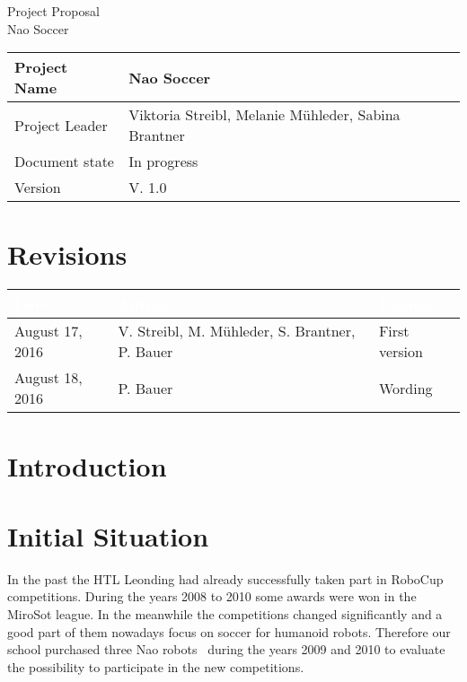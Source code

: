 \documentclass[12pt]{article}
\theoremstyle{definition}
\newcommand{\projectname}{Nao Soccer}
\newcommand{\productname}{Nao Soccer}
\newcommand{\projectleader}{Viktoria Streibl, Melanie Mühleder, Sabina Brantner}
\newcommand{\documentstatus}{In progress}
\newcommand{\version}{V. 1.0}
\begin{document}
\begin{titlepage}
\begin{flushright}
\end{flushright}

\vspace{10em}

\begin{center}
{\Huge Project Proposal} \\[3em]
{\LARGE \productname} \\[3em]
\end{center}

\begin{flushleft}
\begin{tabular}{|l|l|}
\hline
Project Name & \projectname \\ \hline
Project Leader & \projectleader \\ \hline
Document state & \documentstatus \\ \hline
Version & \version \\ \hline
\end{tabular}
\end{flushleft}

\end{titlepage}
\section*{Revisions}
\begin{tabular}{|p{.2\linewidth}|p{.3\linewidth}|p{.42\linewidth}|}
\hline
\cellcolor[gray]{0.5}\textcolor{white}{Date} & \cellcolor[gray]{0.45}\textcolor{white}{Author} & \cellcolor[gray]{0.5}\textcolor{white}{Change} \\ \hline
August 17, 2016&V. Streibl, M. Mühleder, S. Brantner, P. Bauer&First version \\ \hline
August 18, 2016&P. Bauer&Wording \\ \hline
\end{tabular}
\pagebreak

\tableofcontents
\pagebreak

\section{Introduction}

\section{Initial Situation}
In the past the HTL Leonding had already successfully taken part in RoboCup competitions. During the years 2008 to 2010 some awards were won in the MiroSot league. In the meanwhile the competitions changed significantly and a good part of them nowadays focus on soccer for humanoid robots. Therefore our school purchased three Nao robots~\cite{softbank_robotics_who_2016} during the years 2009 and 2010 to evaluate the possibility to participate in the new competitions.
\end{document}
